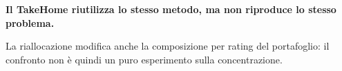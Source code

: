 \documentclass[handout]{beamer}%
\providecommand{\1}{\mathbf{1}}
\begin{document}
\begin{frame}
\begin{center}
\textbf{Il TakeHome riutilizza lo stesso metodo, ma non riproduce lo
stesso problema.}
\end{center}


La riallocazione modifica anche la composizione per rating del
portafoglio: il confronto non \`e quindi un puro esperimento sulla
concentrazione.

\transboxout%
\end{frame}%
\end{document}
